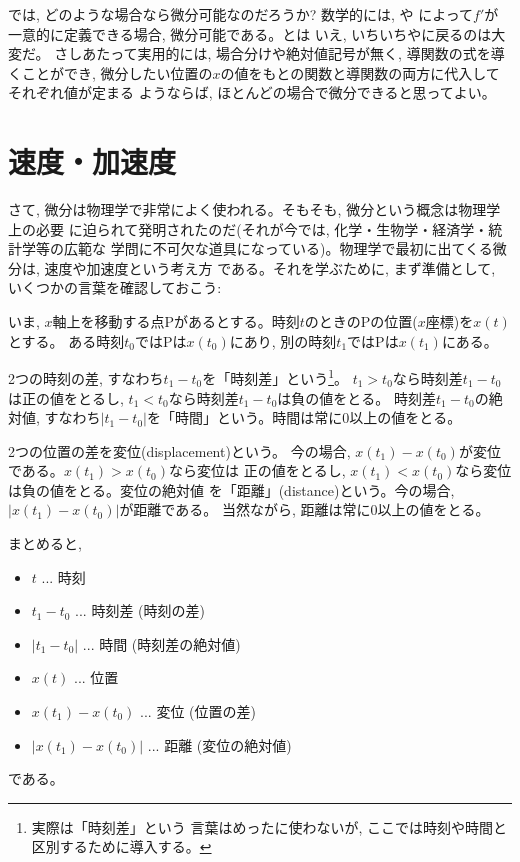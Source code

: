 では, どのような場合なら微分可能なのだろうか? 数学的には, や
によって$f'$が一意的に定義できる場合, 微分可能である。とは
いえ, いちいちやに戻るのは大変だ。
さしあたって実用的には, 場合分けや絶対値記号が無く, 導関数の式を導くことができ, 
微分したい位置の$x$の値をもとの関数と導関数の両方に代入してそれぞれ値が定まる
ようならば, ほとんどの場合で微分できると思ってよい。
\vv




\section{速度・加速度} \label{secvelocity_and_acceleration}

さて, 微分は物理学で非常によく使われる。そもそも, 微分という概念は物理学上の必要
に迫られて発明されたのだ(それが今では, 化学・生物学・経済学・統計学等の広範な
学問に不可欠な道具になっている)。物理学で最初に出てくる微分は, 速度や加速度という考え方
である。それを学ぶために, まず準備として, いくつかの言葉を確認しておこう:
 
いま, $x$軸上を移動する点Pがあるとする。時刻$t$のときのPの位置($x$座標)を$x(t)$とする。
ある時刻$t_0$ではPは$x(t_0)$にあり, 別の時刻$t_1$ではPは$x(t_1)$にある。

2つの時刻の差, すなわち$t_1-t_0$を「時刻差」という\footnote{実際は「時刻差」という
言葉はめったに使わないが, ここでは時刻や時間と区別するために導入する。}。
$t_1>t_0$なら時刻差$t_1-t_0$は正の値をとるし, $t_1<t_0$なら時刻差$t_1-t_0$は負の値をとる。
時刻差$t_1-t_0$の絶対値, すなわち$|t_1-t_0|$を「時間」という。時間は常に0以上の値をとる。

2つの位置の差を変位(displacement)という。
今の場合, $x(t_1)-x(t_0)$が変位である。$x(t_1)>x(t_0)$なら変位は
正の値をとるし, $x(t_1)<x(t_0)$なら変位は負の値をとる。変位の絶対値
を「距離」(distance)という。今の場合, $|x(t_1)-x(t_0)|$が距離である。
当然ながら, 距離は常に0以上の値をとる。

まとめると, 
\begin{itemize}
\item $t$ ... 時刻
\item $t_1-t_0$ ... 時刻差 (時刻の差)
\item $|t_1-t_0|$ ... 時間 (時刻差の絶対値)
\item $x(t)$ ... 位置
\item $x(t_1)-x(t_0)$ ... 変位 (位置の差)
\item $|x(t_1)-x(t_0)|$ ... 距離 (変位の絶対値)
\end{itemize}
である。

